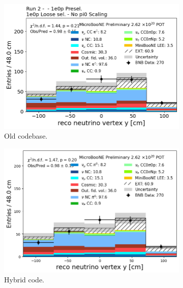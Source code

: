 \begin{figure}[H]
    \centering
    \begin{subfigure}[t]{0.32\linewidth}
        \includegraphics[width=\linewidth]{technote/Appendix_Validation/Figures/1e0p_Loose/Run2_Vertex_Y_Old.png}
        \caption{Old codebase.}
    \end{subfigure}%
    \hspace{0.2cm}%
    \begin{subfigure}[t]{0.32\linewidth}
        \includegraphics[width=\linewidth]{technote/Appendix_Validation/Figures/1e0p_Loose/Run2_Vertex_Y_Chris.png}
        \caption{Hybrid code.}
    \end{subfigure}%
    \hspace{0.2cm}%
    \begin{subfigure}[t]{0.32\linewidth}

\end{subfigure}
\end{figure}
